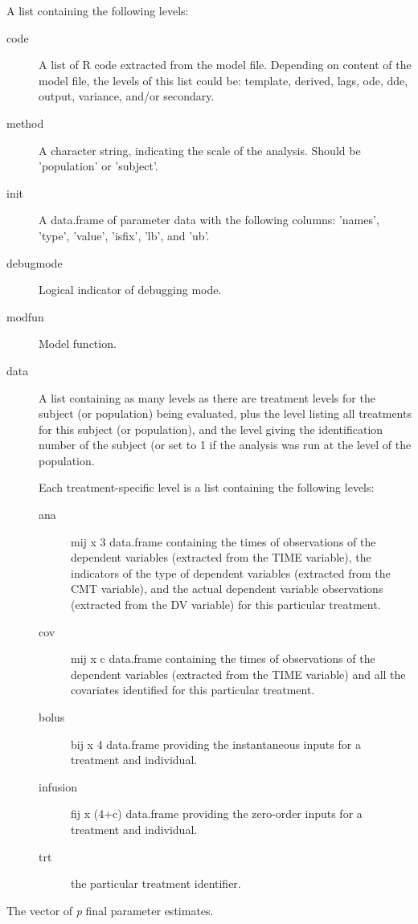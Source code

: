 \begin{Arguments}
\begin{ldescription}
\item[\code{subproblem}] A list containing the following levels:\begin{description}

\item[code] A list of R code extracted from the model file. Depending on 
content of the model file, the levels of this list could be: template,
derived, lags, ode, dde, output, variance, and/or secondary.
\item[method] A character string, indicating the scale of the analysis. Should
be 'population' or 'subject'.
\item[init] A data.frame of parameter data with the following columns:
'names', 'type', 'value', 'isfix', 'lb', and 'ub'.
\item[debugmode] Logical indicator of debugging mode.
\item[modfun] Model function.
\item[data] A list containing as many levels as there are treatment levels 
for the subject (or population) being evaluated, plus the  
level listing all treatments for this subject (or population), and the 
 level giving the identification number of the subject (or set to
1 if the analysis was run at the level of the population.

Each treatment-specific level is a list containing the following levels: 
\begin{description}

\item[ana] mij x 3 data.frame containing the times of observations of the
dependent variables (extracted from the TIME variable), the indicators
of the type of dependent variables (extracted from the CMT variable),
and the actual dependent variable observations (extracted from the 
DV variable) for this particular treatment.
\item[cov] mij x c data.frame containing the times of observations of 
the dependent variables (extracted from the TIME variable) and all the
covariates identified for this particular treatment.
\item[bolus] bij x 4 data.frame providing the instantaneous inputs 
for a treatment and individual.
\item[infusion] fij x (4+c) data.frame providing the zero-order inputs 
for a treatment and individual.
\item[trt] the particular treatment identifier.

\end{description}


\end{description}


\item[\code{x}] The vector of \emph{p} final parameter estimates.
\end{ldescription}
\end{Arguments}

